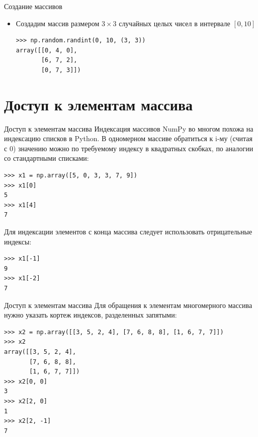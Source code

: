 \documentclass[aspectratio=169, mathserif]{beamer}%
\begin{document}
\begin{frame}[fragile]{Создание массивов}
\scriptsize
\begin{itemize}
	\item Создадим массив размером $3 \times 3$ случайных целых чисел в интервале $\left[0, 10\right]$
\begin{verbatim}
>>> np.random.randint(0, 10, (3, 3))
array([[0, 4, 0],
       [6, 7, 2],
       [0, 7, 3]])
\end{verbatim}
\end{itemize}
\vfill
\end{frame}

\section{Доступ к элементам массива}
\begin{frame}[fragile]{Доступ к элементам массива}
\scriptsize
Индексация массивов NumPy во многом похожа на индексацию списков в Python.
В одномерном массиве обратиться к $\mathrm{i}$-му (считая с $0$) значению можно по требуемому индексу в квадратных скобках, по аналогии со стандартными списками:

\begin{verbatim}
>>> x1 = np.array([5, 0, 3, 3, 7, 9])
>>> x1[0]
5
>>> x1[4]
7
\end{verbatim}

Для индексации элементов с конца массива следует использовать отрицательные индексы:

\begin{verbatim}
>>> x1[-1]
9
>>> x1[-2]
7
\end{verbatim}
\end{frame}

\begin{frame}[fragile]{Доступ к элементам массива}
\scriptsize
Для обращения к элементам многомерного массива нужно указать кортеж индексов, разделенных запятыми:
\begin{verbatim}
>>> x2 = np.array([[3, 5, 2, 4], [7, 6, 8, 8], [1, 6, 7, 7]])
>>> x2
array([[3, 5, 2, 4],
       [7, 6, 8, 8],
       [1, 6, 7, 7]])
>>> x2[0, 0]
3
>>> x2[2, 0]
1
>>> x2[2, -1]
7
\end{verbatim}
\end{frame}
\end{document}
